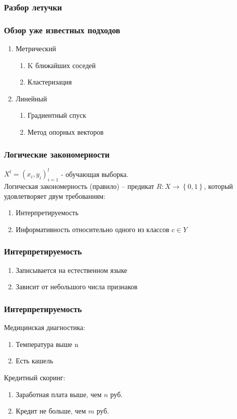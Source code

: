 \documentclass[12pt]{beamer}
\subtitle{Лекция 8. Логические алгоритмы классификации.}
\begin{document}
	
\frame{\titlepage}

\begin{frame}\frametitle{Разбор летучки}

\end{frame}

\begin{frame}\frametitle{Обзор уже известных подходов}
\begin{enumerate} 
	\item Метрический
		\begin{enumerate} [--]
			\item K ближайших соседей
			\item Кластеризация 
		\end{enumerate}
	\item Линейный
		\begin{enumerate} [--]
			\item Градиентный спуск
			\item Метод опорных векторов
		\end{enumerate}
\end{enumerate}
\end{frame}

\begin{frame}\frametitle{Логические закономерности}
${X^l = \left( x_i, y_i \right)_{i=1}^l}$ - обучающая выборка.\\
\vspace{5mm}
Логическая закономерность (правило) -- предикат ${R: X \rightarrow \left\{ 0, 1 \right\} }$, который удовлетворяет двум требованиям:\\
\begin{enumerate} [-]
	\item Интерпретируемость
	\item Информативность относительно одного из классов ${c \in Y}$
\end{enumerate}
\end{frame}


\begin{frame}\frametitle{Интерпретируемость}
	\begin{enumerate} [-]
		\item Записывается на естественном языке
		\item Зависит от небольшого числа признаков
	\end{enumerate}
\end{frame}

\begin{frame}\frametitle{Интерпретируемость}
Медицинская диагностика:	
	\begin{enumerate} [-]
		\item Температура выше n\degree
		\item Есть кашель
	\end{enumerate}
\vspace{5mm}
Кредитный скоринг:	
	\begin{enumerate} [-]
		\item Заработная плата выше, чем $n$ руб.
		\item Кредит не больше, чем $m$ руб.
	\end{enumerate}
\end{frame}
\end{document}
